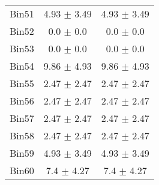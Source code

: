 \begin{tabular}{|c|c|c|}
     Bin51 & 4.93 $\pm$ 3.49 & 4.93 $\pm$ 3.49 \\ \cline{1-3} 
     Bin52 & 0.0 $\pm$ 0.0 & 0.0 $\pm$ 0.0 \\ \cline{1-3} 
     Bin53 & 0.0 $\pm$ 0.0 & 0.0 $\pm$ 0.0 \\ \cline{1-3} 
     Bin54 & 9.86 $\pm$ 4.93 & 9.86 $\pm$ 4.93 \\ \cline{1-3} 
     Bin55 & 2.47 $\pm$ 2.47 & 2.47 $\pm$ 2.47 \\ \cline{1-3} 
     Bin56 & 2.47 $\pm$ 2.47 & 2.47 $\pm$ 2.47 \\ \cline{1-3} 
     Bin57 & 2.47 $\pm$ 2.47 & 2.47 $\pm$ 2.47 \\ \cline{1-3} 
     Bin58 & 2.47 $\pm$ 2.47 & 2.47 $\pm$ 2.47 \\ \cline{1-3} 
     Bin59 & 4.93 $\pm$ 3.49 & 4.93 $\pm$ 3.49 \\ \cline{1-3} 
     Bin60 & 7.4 $\pm$ 4.27 & 7.4 $\pm$ 4.27 \\ \cline{1-3} 
  \end{tabular}
